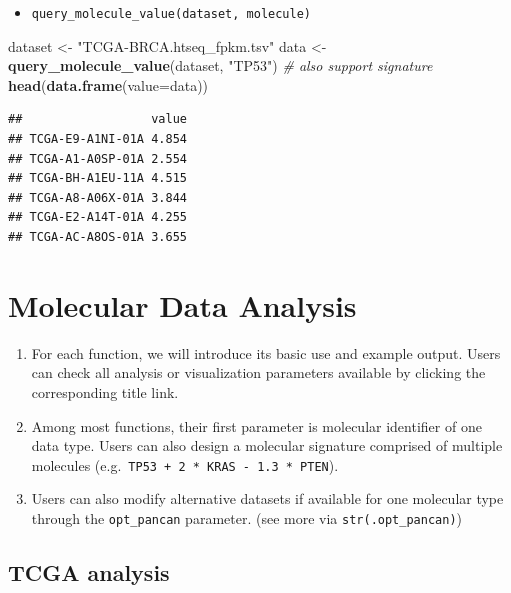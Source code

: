 \documentclass[
]{book}
\newenvironment{Shaded}{\begin{snugshade}}{\end{snugshade}}
\newcommand{\AttributeTok}[1]{\textcolor[rgb]{0.13,0.29,0.53}{#1}}
\newcommand{\CommentTok}[1]{\textcolor[rgb]{0.56,0.35,0.01}{\textit{#1}}}
\newcommand{\FunctionTok}[1]{\textcolor[rgb]{0.13,0.29,0.53}{\textbf{#1}}}
\newcommand{\NormalTok}[1]{#1}
\newcommand{\OtherTok}[1]{\textcolor[rgb]{0.56,0.35,0.01}{#1}}
\newcommand{\StringTok}[1]{\textcolor[rgb]{0.31,0.60,0.02}{#1}}
\providecommand{\tightlist}{%
  \setlength{\itemsep}{0pt}\setlength{\parskip}{0pt}}
\begin{document}
\begin{itemize}
\tightlist
\item
  \texttt{query\_molecule\_value(dataset,\ molecule)}
\end{itemize}

\begin{Shaded}
\begin{Highlighting}[]
\NormalTok{dataset }\OtherTok{\textless{}{-}} \StringTok{"TCGA{-}BRCA.htseq\_fpkm.tsv"}
\NormalTok{data }\OtherTok{\textless{}{-}} \FunctionTok{query\_molecule\_value}\NormalTok{(dataset, }\StringTok{"TP53"}\NormalTok{) }\CommentTok{\# also support signature }
\FunctionTok{head}\NormalTok{(}\FunctionTok{data.frame}\NormalTok{(}\AttributeTok{value=}\NormalTok{data))}
\end{Highlighting}
\end{Shaded}

\begin{verbatim}
##                  value
## TCGA-E9-A1NI-01A 4.854
## TCGA-A1-A0SP-01A 2.554
## TCGA-BH-A1EU-11A 4.515
## TCGA-A8-A06X-01A 3.844
## TCGA-E2-A14T-01A 4.255
## TCGA-AC-A8OS-01A 3.655
\end{verbatim}

\chapter{Molecular Data Analysis}\label{data-analysis}

\begin{enumerate}
\def\labelenumi{\arabic{enumi}.}
\item
  For each function, we will introduce its basic use and example output. Users can check all analysis or visualization parameters available by clicking the corresponding title link.
\item
  Among most functions, their first parameter is molecular identifier of one data type. Users can also design a molecular signature comprised of multiple molecules (e.g.~\texttt{TP53\ +\ 2\ *\ KRAS\ -\ 1.3\ *\ PTEN}).
\item
  Users can also modify alternative datasets if available for one molecular type through the \texttt{opt\_pancan} parameter. (see more via \texttt{str(.opt\_pancan)})
\end{enumerate}

\section{TCGA analysis}\label{tcga-analysis}
\end{document}
